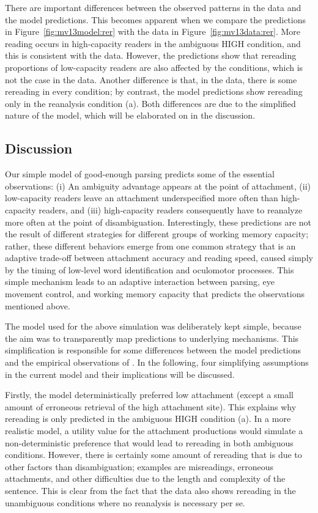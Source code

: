 \documentclass{cambridge7A}\usepackage[]{graphicx}\usepackage[]{color}
\begin{document}
There are important differences between the observed patterns in the data and the model predictions. This becomes apparent when we compare the predictions in Figure~\ref{fig:mv13model:rer} with the data in Figure~\ref{fig:mv13data:rer}. More reading occurs in high-capacity readers in the ambiguous HIGH condition, and this is consistent with the data. However, the predictions show that rereading proportions of low-capacity readers are also affected by the conditions, which is not the case in the data. Another difference is that, in the data, there is some rereading in every condition; by contrast, the model predictions show rereading only in the reanalysis condition (a). Both differences are due to the simplified nature of the model, which will be elaborated on in the discussion.


\subsection{Discussion}
Our simple model of good-enough parsing predicts some of the essential observations: (i) An ambiguity advantage appears at the point of attachment, (ii) low-capacity readers leave an attachment underspecified more often than high-capacity readers, and (iii) high-capacity readers consequently have to reanalyze more often at the point of disambiguation.
Interestingly, these predictions are not the result of different strategies for different groups of working memory capacity; rather, these different behaviors emerge from one common strategy that is an adaptive trade-off between attachment accuracy and reading speed, caused simply by the timing of low-level word identification and oculomotor processes. This simple mechanism leads to an adaptive interaction between parsing, eye movement control, and working memory capacity that predicts the observations mentioned above.

The model used for the above simulation was deliberately kept simple, because the aim was to transparently map predictions to underlying mechanisms. This simplification is responsible for some differences between the model predictions and the empirical observations of \cite{MalsburgVasishth2013}. In the following, four simplifying assumptions in the current model and their implications will be discussed.

Firstly, the model deterministically preferred low attachment (except a small amount of erroneous retrieval of the high attachment site). This explains why rereading is only predicted in the ambiguous HIGH condition (a). In a more realistic model, a utility value for the attachment productions would simulate a non-deterministic preference that would lead to rereading in both ambiguous conditions. However, there is certainly some amount of rereading that is due to other factors than disambiguation; examples are misreadings, erroneous attachments, and other difficulties due to the length and complexity of the sentence. This is clear from the fact that the data also shows rereading in the unambiguous conditions where no reanalysis is necessary per se.
\end{document}
